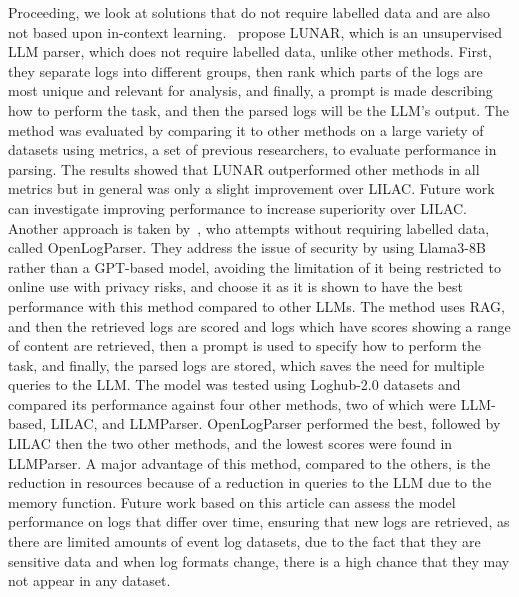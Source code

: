 Proceeding, we look at solutions that do not require labelled data and are also not based upon in-context learning.~\cite{huang2024ulog} propose LUNAR, which is an unsupervised LLM parser, which does not require labelled data, unlike other methods. First, they separate logs into different groups, then rank which parts of the logs are most unique and relevant for analysis, and finally, a prompt is made describing how to perform the task, and then the parsed logs will be the LLM's output. The method was evaluated by comparing it to other methods on a large variety of datasets using metrics, a set of previous researchers, to evaluate performance in parsing. The results showed that LUNAR outperformed other methods in all metrics but in general was only a slight improvement over LILAC. Future work can investigate improving performance to increase superiority over LILAC. Another approach is taken by~\cite{ma2024librelog}, who attempts without requiring labelled data, called OpenLogParser. They address the issue of security by using Llama3-8B rather than a GPT-based model, avoiding the limitation of it being restricted to online use with privacy risks, and choose it as it is shown to have the best performance with this method compared to other LLMs. The method uses RAG, and then the retrieved logs are scored and logs which have scores showing a range of content are retrieved, then a prompt is used to specify how to perform the task, and finally, the parsed logs are stored, which saves the need for multiple queries to the LLM. The model was tested using Loghub-2.0 datasets and compared its performance against four other methods, two of which were LLM-based, LILAC, and LLMParser. OpenLogParser performed the best, followed by LILAC then the two other methods, and the lowest scores were found in LLMParser. A major advantage of this method, compared to the others, is the reduction in resources because of a reduction in queries to the LLM due to the memory function. Future work based on this article can assess the model performance on logs that differ over time, ensuring that new logs are retrieved, as there are limited amounts of event log datasets, due to the fact that they are sensitive data and when log formats change, there is a high chance that they may not appear in any dataset.

